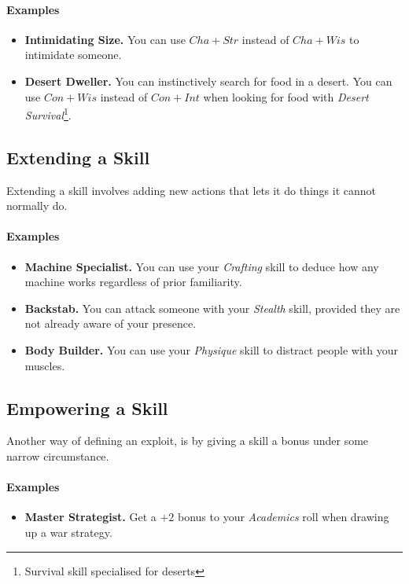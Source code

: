 \paragraph{Examples}
\begin{itemize}
    \item \textbf{Intimidating Size.} You can use $Cha+Str$ instead of $Cha+Wis$ to intimidate someone.
    \item \textbf{Desert Dweller.} You can instinctively search for food in a desert. You can use $Con+Wis$ instead of $Con+Int$ when looking for food with \textit{Desert Survival}\footnote{Survival skill specialised for deserts}.
\end{itemize}

\subsection{Extending a Skill}
Extending a skill involves adding new actions that lets it do things it cannot normally do.

\paragraph{Examples}
\begin{itemize}
    \item \textbf{Machine Specialist.} You can use your \textit{Crafting} skill to deduce how any machine works regardless of prior familiarity.
    \item \textbf{Backstab.} You can attack someone with your \textit{Stealth} skill, provided they are not already aware of your presence.
    \item \textbf{Body Builder.} You can use your \textit{Physique} skill to distract people with your muscles.
\end{itemize}

\subsection{Empowering a Skill}
Another way of defining an exploit, is by giving a skill a bonus under some narrow circumstance.

\paragraph{Examples}
\begin{itemize}
    \item \textbf{Master Strategist.} Get a $+2$ bonus to your \textit{Academics} roll when drawing up a war strategy.
\end{itemize}

